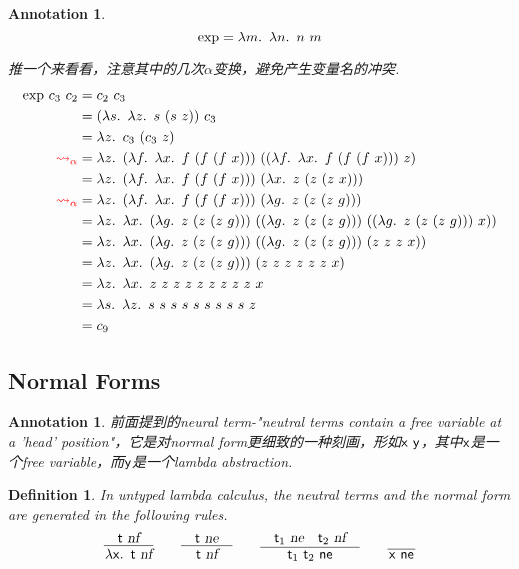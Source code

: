 \documentclass{article}
\theoremstyle{plain}
\newtheorem{definition}[theorem]{Definition}
\newtheorem{annotation}[theorem]{Annotation}
\theoremstyle{nonumberplain}
\newcommand{\lam}[2]{\ensuremath{\lambda #1\ldotp~ #2}} %
\newcommand{\term}[1]{\ensuremath\mathsf{#1}}
\begin{document}
\begin{annotation} \rm 
$$
\text{exp} = \lam{m}{\lam{n}{n~m}}
$$

推一个来看看，注意其中的几次$\alpha$变换，避免产生变量名的冲突.
$$
\begin{aligned}
\text{exp}~c_3~c_2 &= c_2~c_3 \\
			&= (\lam{s}{\lam{z}{s~(s~z)}})~c_3 \\
			&= \lam{z}{c_3~(c_3~z)} \\
	{\color{red}\leadsto_\alpha} &= \lam{z}{(\lam{f}{\lam{x}{f~(f~(f~x))}})~((\lam{f}{\lam{x}{f~(f~(f~x))}})~z)} \\
			&= \lam{z}{(\lam{f}{\lam{x}{f~(f~(f~x))}})~(\lam{x}{z~(z~(z~x))})} \\
	{\color{red}\leadsto_\alpha} &= \lam{z}{(\lam{f}{\lam{x}{f~(f~(f~x))}})~(\lam{g}{z~(z~(z~g))})} \\
			&= \lam{z}{\lam{x}{(\lam{g}{z~(z~(z~g))})~((\lam{g}{z~(z~(z~g))})~((\lam{g}{z~(z~(z~g))})~x))}} \\
			&= \lam{z}{\lam{x}{(\lam{g}{z~(z~(z~g))})~((\lam{g}{z~(z~(z~g))})~(z~z~z~x))}}\\
			&= \lam{z}{\lam{x}{(\lam{g}{z~(z~(z~g))})~(z~z~z~z~z~z~x)}} \\
			&= \lam{z}{\lam{x}{z~z~z~z~z~z~z~z~z~x}} \\
			&= \lam{s}{\lam{z}{s~s~s~s~s~s~s~s~s~z}} \\
			&= c_9 \\	
\end{aligned}
$$
\end{annotation}

\newpage
\subsection{Normal Forms}

\begin{annotation}
\rm 前面提到的neural term-"neutral terms contain a free variable at a 'head' position"，它是对normal form更细致的一种刻画，形如$\term{x}~\term{y}$，其中$\term{x}$是一个free variable，而$\term{y}$是一个lambda abstraction. 
\end{annotation}

\begin{definition}
\rm In untyped lambda calculus, the neutral terms and the normal form are generated in the following rules.
$$
\begin{array}{ccccccc}
\infer{\lam{\term{x}}{\term{t}}~\textsl{nf}}{&\term{t}~\textsl{nf}&} &&
\infer{\term{t}~\textsl{nf}}{&\term{t}~\textsl{ne}&} &&
\infer{\term{t}_1~\term{t}_2~\textsf{ne}}{&\term{t}_1~\textsl{ne}& \term{t}_2~\textsl{nf}&} && \infer{\term{x}~\textsf{ne}}{& &}
\end{array}
$$
\end{definition}
\end{document}

